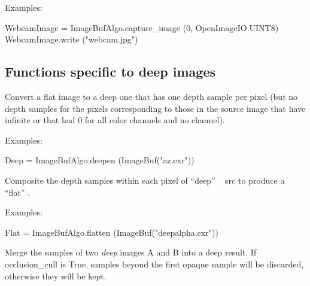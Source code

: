 \smallskip
\noindent Examples:
\begin{code}
    WebcamImage = ImageBufAlgo.capture_image (0, OpenImageIO.UINT8)
    WebcamImage.write ("webcam.jpg")
\end{code}
\apiend


\subsection{Functions specific to deep images}

  

Convert a flat image to a deep one that has one depth sample per pixel
(but no depth samples for the pixels corresponding to those in the source
image that have infinite  or that had 0 for all color channels and no
 channel).

\smallskip
\noindent Examples:
\begin{code}
    Deep = ImageBufAlgo.deepen (ImageBuf("az.exr"))
\end{code}
\apiend


  

Composite the depth samples within each pixel of ``deep'' \ImageBuf\ {\cf
src} to produce a ``flat'' \ImageBuf.

\smallskip
\noindent Examples:
\begin{code}
    Flat = ImageBufAlgo.flatten (ImageBuf("deepalpha.exr"))
\end{code}
\apiend

  

Merge the samples of two \emph{deep} images {\cf A} and {\cf B} into a deep
result. If {\cf occlusion_cull} is {\cf True}, samples beyond
the first opaque sample will be discarded, otherwise they will be kept.


